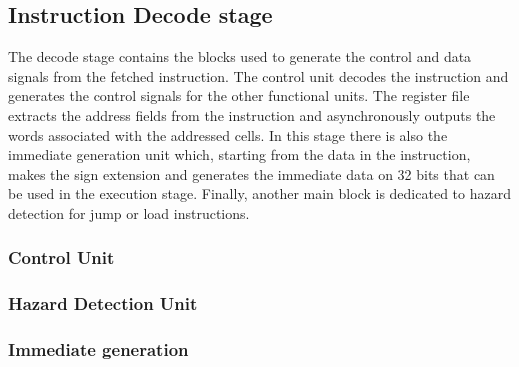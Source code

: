 \subsection{Instruction Decode stage}
The decode stage contains the blocks used to generate the control and data signals from the fetched instruction. The control unit decodes the instruction and generates the control signals for the other functional units. The register file extracts the address fields from the instruction and asynchronously outputs the words associated with the addressed cells. In this stage there is also the immediate generation unit which, starting from the data in the instruction, makes the sign extension and generates the immediate data on 32 bits that can be used in the execution stage. Finally, another main block is dedicated to hazard detection for jump or load instructions.

\subsubsection{Control Unit}

\subsubsection{Hazard Detection Unit}

\subsubsection{Immediate generation}
